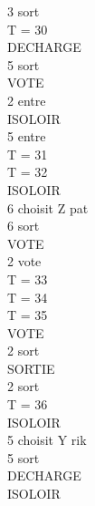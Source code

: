 \documentclass[12pt]{article} %
\begin{document}
\begin{multicols}{3}
{			\hspace*{12mm} 3 sort\\
			T = 30\\
			\hspace*{5mm} DECHARGE\\
			\hspace*{12mm} 5 sort\\
			\hspace*{5mm} VOTE\\
			\hspace*{12mm} 2 entre\\
			\hspace*{5mm} ISOLOIR\\
			\hspace*{12mm} 5 entre\\
			T = 31\\
			T = 32\\
			\hspace*{5mm} ISOLOIR\\
			\hspace*{12mm} 6 choisit Z pat\\
			\hspace*{12mm} 6 sort\\
			\hspace*{5mm} VOTE\\
			\hspace*{12mm} 2 vote\\
			T = 33\\
			T = 34\\
			T = 35\\
			\hspace*{5mm} VOTE\\
			\hspace*{12mm} 2 sort\\
			\hspace*{5mm} SORTIE\\
			\hspace*{12mm} 2 sort\\
			T = 36\\
			\hspace*{5mm} ISOLOIR\\
			\hspace*{12mm} 5 choisit Y rik\\
			\hspace*{12mm} 5 sort\\
			\hspace*{5mm} DECHARGE\\
			\hspace*{5mm} ISOLOIR\\
}
\end{multicols}
\end{document}
